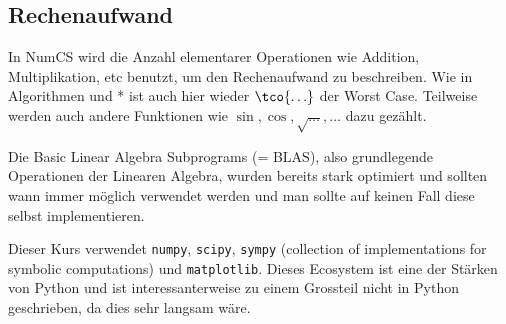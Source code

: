 \newsection
\subsection{Rechenaufwand}
In NumCS wird die Anzahl elementarer Operationen wie Addition, Multiplikation, etc benutzt, um den Rechenaufwand zu beschreiben. 
Wie in Algorithmen und * ist auch hier wieder $\tco{\ldots}$ der Worst Case.
Teilweise werden auch andere Funktionen wie $\sin, \cos, \sqrt{\ldots}, \ldots$ dazu gezählt.

Die Basic Linear Algebra Subprograms (= BLAS), also grundlegende Operationen der Linearen Algebra, wurden bereits stark optimiert und sollten wann immer möglich verwendet werden und man sollte auf keinen Fall diese selbst implementieren.

Dieser Kurs verwendet \texttt{numpy}, \texttt{scipy}, \texttt{sympy} (collection of implementations for symbolic computations) und \texttt{matplotlib}.
Dieses Ecosystem ist eine der Stärken von Python und ist interessanterweise zu einem Grossteil nicht in Python geschrieben, da dies sehr langsam wäre.

